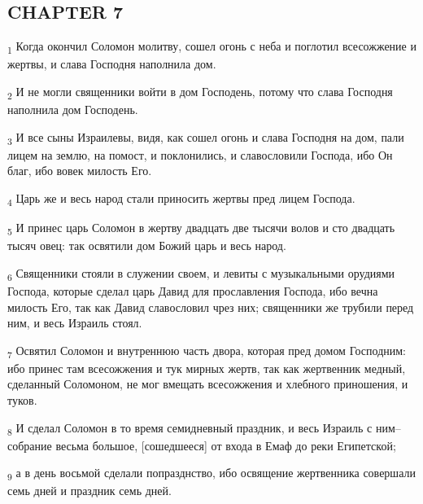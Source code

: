 \subsection{CHAPTER 7}
\begin{tcolorbox}
\textsubscript{1} Когда окончил Соломон молитву, сошел огонь с неба и поглотил всесожжение и жертвы, и слава Господня наполнила дом.
\end{tcolorbox}
\begin{tcolorbox}
\textsubscript{2} И не могли священники войти в дом Господень, потому что слава Господня наполнила дом Господень.
\end{tcolorbox}
\begin{tcolorbox}
\textsubscript{3} И все сыны Израилевы, видя, как сошел огонь и слава Господня на дом, пали лицем на землю, на помост, и поклонились, и славословили Господа, ибо Он благ, ибо вовек милость Его.
\end{tcolorbox}
\begin{tcolorbox}
\textsubscript{4} Царь же и весь народ стали приносить жертвы пред лицем Господа.
\end{tcolorbox}
\begin{tcolorbox}
\textsubscript{5} И принес царь Соломон в жертву двадцать две тысячи волов и сто двадцать тысяч овец: так освятили дом Божий царь и весь народ.
\end{tcolorbox}
\begin{tcolorbox}
\textsubscript{6} Священники стояли в служении своем, и левиты с музыкальными орудиями Господа, которые сделал царь Давид для прославления Господа, ибо вечна милость Его, так как Давид славословил чрез них; священники же трубили перед ним, и весь Израиль стоял.
\end{tcolorbox}
\begin{tcolorbox}
\textsubscript{7} Освятил Соломон и внутреннюю часть двора, которая пред домом Господним: ибо принес там всесожжения и тук мирных жертв, так как жертвенник медный, сделанный Соломоном, не мог вмещать всесожжения и хлебного приношения, и туков.
\end{tcolorbox}
\begin{tcolorbox}
\textsubscript{8} И сделал Соломон в то время семидневный праздник, и весь Израиль с ним--собрание весьма большое, [сошедшееся] от входа в Емаф до реки Египетской;
\end{tcolorbox}
\begin{tcolorbox}
\textsubscript{9} а в день восьмой сделали попразднство, ибо освящение жертвенника совершали семь дней и праздник семь дней.
\end{tcolorbox}
